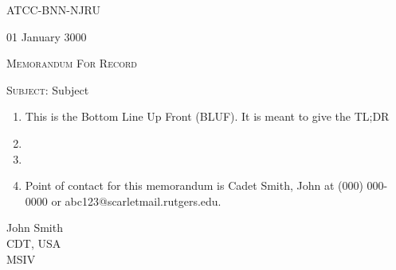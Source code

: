\documentclass[12pt,letterpaper]{article}
\newcommand{\memotype}[1]{\noindent\textsc{#1}}
\newcommand{\subject}[1]{\noindent\textsc{Subject}: #1}
\newcommand\textbox[1]{\parbox{.5\textwidth}{#1}}
\newcommand{\Subject}{Subject}
\newcommand{\OfficeSymbol}{ATCC-BNN-NJRU}
\newcommand{\Date}{01 January 3000}
\begin{document}
\vspace{15pt}

\noindent\textbox{\OfficeSymbol\hfill} \textbox{\hfill\Date}

\vspace{24pt}

\memotype{Memorandum For Record}

\vspace{12pt}

\subject{\Subject}

\vspace{12pt}

\thispagestyle{firststyle}

\raggedright

\begin{enumerate}[labelwidth=12pt,labelsep=4pt,leftmargin=0pt,itemindent=16pt,align=left]
  \item This is the Bottom Line Up Front (BLUF). It is meant to give the TL;DR

  \item \blindtext

  \item \blindtext

  \item Point of contact for this memorandum is Cadet Smith,  John at (000) 000-0000 or abc123@scarletmail.rutgers.edu.

\end{enumerate}

\begin{flushright}

\begin{Form}
\end{Form}

John Smith
\\CDT,  USA
\\MSIV

\end{flushright}
\end{document}
